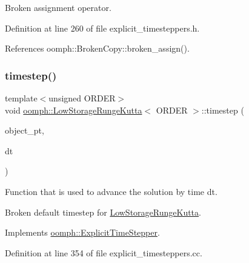 Broken assignment operator. 



Definition at line 260 of file explicit\+\_\+timesteppers.\+h.



References oomph\+::\+Broken\+Copy\+::broken\+\_\+assign().

\mbox{\label{classoomph_1_1LowStorageRungeKutta_afc3d30c130b3a6ab111a89f0b0f884d6}} 
\subsubsection{\texorpdfstring{timestep()}{timestep()}\hspace{0.1cm}{\footnotesize\ttfamily [1/2]}}
{\footnotesize\ttfamily template$<$unsigned O\+R\+D\+ER$>$ \\
void \hyperlink{classoomph_1_1LowStorageRungeKutta}{oomph\+::\+Low\+Storage\+Runge\+Kutta}$<$ O\+R\+D\+ER $>$\+::timestep (\begin{DoxyParamCaption}\item[{\hyperlink{classoomph_1_1ExplicitTimeSteppableObject}{Explicit\+Time\+Steppable\+Object} $\ast$const \&}]{object\+\_\+pt,  }\item[{const double \&}]{dt }\end{DoxyParamCaption})\hspace{0.3cm}{\ttfamily [virtual]}}



Function that is used to advance the solution by time dt. 

Broken default timestep for \hyperlink{classoomph_1_1LowStorageRungeKutta}{Low\+Storage\+Runge\+Kutta}. 

Implements \hyperlink{classoomph_1_1ExplicitTimeStepper_ab43bbab17960d0f50b8842e996f5c765}{oomph\+::\+Explicit\+Time\+Stepper}.



Definition at line 354 of file explicit\+\_\+timesteppers.\+cc.

\mbox{\label{classoomph_1_1LowStorageRungeKutta_ab2bcb2ad33cec657fd113debc8c4705b}} 
